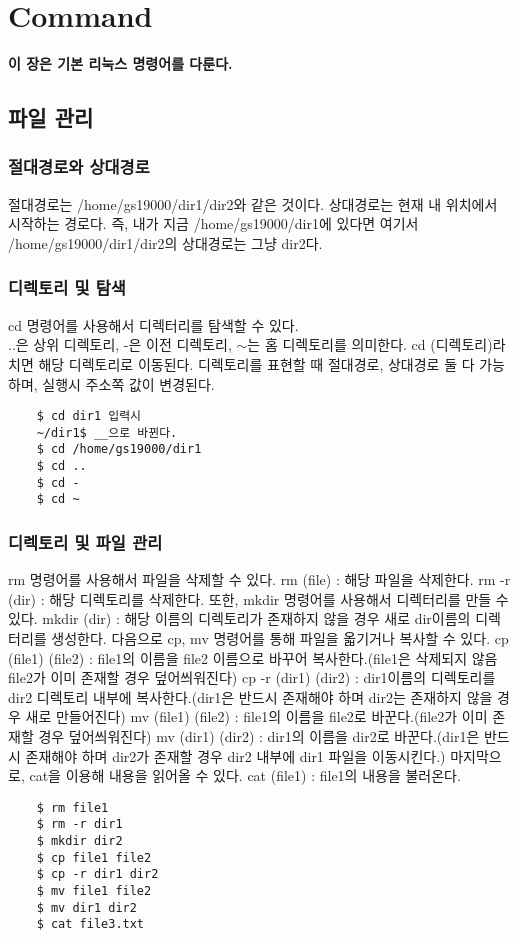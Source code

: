 
\graphicspath{{./chap3/images/}} 
\chapter{Command}
\textbf{이 장은 기본 리눅스 명령어를 다룬다.}
\section{파일 관리}
\subsection{절대경로와 상대경로}
절대경로는 /home/gs19000/dir1/dir2와 같은 것이다. 상대경로는 현재 내 위치에서 시작하는 경로다. 즉, 내가 지금 /home/gs19000/dir1에 있다면 여기서 /home/gs19000/dir1/dir2의 상대경로는 그냥 dir2다.
\subsection{디렉토리 및 탐색}
cd 명령어를 사용해서 디렉터리를 탐색할 수 있다. \\ ..은 상위 디렉토리, -은 이전 디렉토리, $\sim$는 홈 디렉토리를 의미한다.
cd (디렉토리)라 치면 해당 디렉토리로 이동된다. 디렉토리를 표현할 때 절대경로, 상대경로 둘 다 가능하며, 실행시 주소쪽 값이 변경된다.
\begin{lstlisting}
    $ cd dir1 입력시
    ~/dir1$ __으로 바뀐다.
    $ cd /home/gs19000/dir1 
    $ cd ..
    $ cd -
    $ cd ~
\end{lstlisting}
\subsection{디렉토리 및 파일 관리}
rm 명령어를 사용해서 파일을 삭제할 수 있다. rm (file) : 해당 파일을 삭제한다. rm -r (dir) : 해당 디렉토리를 삭제한다.
또한, mkdir 명령어를 사용해서 디렉터리를 만들 수 있다. mkdir (dir) : 해당 이름의 디렉토리가 존재하지 않을 경우 새로 dir이름의 디렉터리를 생성한다. 다음으로 cp, mv 명령어를 통해 파일을 옯기거나 복사할 수 있다. cp (file1) (file2) : file1의 이름을 file2 이름으로 바꾸어 복사한다.(file1은 삭제되지 않음 file2가 이미 존재할 경우 덮어씌워진다) cp -r (dir1) (dir2) : dir1이름의 디렉토리를 dir2 디렉토리 내부에 복사한다.(dir1은 반드시 존재해야 하며 dir2는 존재하지 않을 경우 새로 만들어진다) mv (file1) (file2) : file1의 이름을 file2로 바꾼다.(file2가 이미 존재할 경우 덮어씌워진다) mv (dir1) (dir2) : dir1의 이름을 dir2로 바꾼다.(dir1은 반드시 존재해야 하며 dir2가 존재할 경우 dir2 내부에 dir1 파일을 이동시킨다.) 마지막으로, cat을 이용해 내용을 읽어올 수 있다. cat (file1) : file1의 내용을 불러온다.
    \begin{lstlisting}
    $ rm file1
    $ rm -r dir1
    $ mkdir dir2
    $ cp file1 file2
    $ cp -r dir1 dir2
    $ mv file1 file2
    $ mv dir1 dir2
    $ cat file3.txt
    \end{lstlisting}
